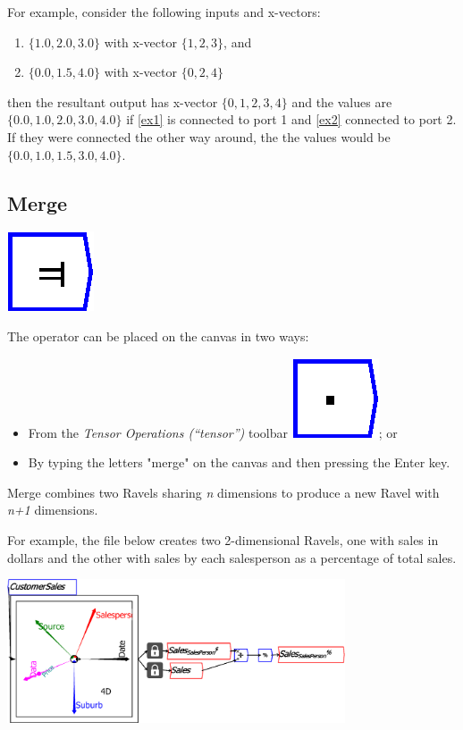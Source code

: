 For example, consider the following inputs and x-vectors:
\begin{enumerate}
\item \label{ex1} $\{1.0,2.0,3.0\}$ with x-vector $\{1,2,3\}$, and 
\item \label{ex2} $\{0.0,1.5,4.0\}$ with x-vector $\{0,2,4\}$ 
\end{enumerate}
then the resultant output has x-vector $\{0,1,2,3,4\}$ and the values
are $\{0.0,1.0,2.0,3.0,4.0\}$ if \ref{ex1} is connected to port
1 and \ref{ex2} connected to port 2. If they were connected the other
way around, the the values would be $\{0.0,1.0,1.5,3.0,4.0\}$.

\subsection{Merge}

\label{Operation:merge}

\includegraphics{images/merge}

The operator can be placed on the canvas in two ways:
\begin{itemize}
\item From the \emph{Tensor Operations (``tensor'')} toolbar \includegraphics{images/innerProduct};
or 
\item By typing the letters "merge" on the canvas and then pressing the
Enter key.
\end{itemize}
Merge combines two Ravels sharing \emph{n} dimensions to produce a
new Ravel with \emph{n+1} dimensions.

For example, the file below creates two 2-dimensional Ravels, one
with sales in dollars and the other with sales by each salesperson
as a percentage of total sales.

\includegraphics[width=10cm]{images/MergeExample01TwoVariables}

